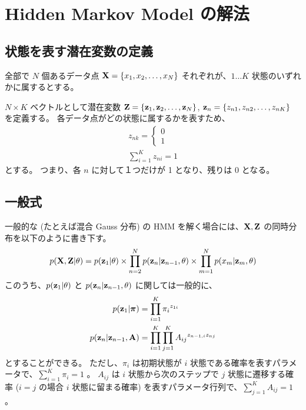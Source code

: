 
\section{ Hidden Markov Model の解法 }

\subsection{ 状態を表す潜在変数の定義 }

全部で $N$ 個あるデータ点 ${\bf X} = \{ x_1, x_2, \dots , x_N\}$ それぞれが、$1 \dots K$ 状態のいずれかに属するとする。

$N \times K$ ベクトルとして潜在変数 ${\bf Z} = \{ {\bf z}_1, {\bf z}_2, \dots, {\bf z}_N \}$, ${\bf z}_n = \{ z_{n1}, z_{n2}, \dots, z_{nK} \}$ を定義する。
各データ点がどの状態に属するかを表すため、
\begin{gather}
  z_{nk} = \begin{cases}
    0  \\
    1  
  \end{cases}  \\
  \sum_{i=1}^K z_{ni} = 1
\end{gather}
とする。
つまり、各 $n$ に対して１つだけが 1 となり、残りは 0 となる。

\subsection{ 一般式 }

一般的な (たとえば混合 Gauss 分布) の HMM を解く場合には、${\bf X}, {\bf Z}$ の同時分布を以下のように書き下す。
\begin{equation}
  p( {\bf X}, {\bf Z} | \theta )  =  p( {\bf z}_1 | \theta ) \times \prod_{n=2}^N p( {\bf z}_n | {\bf z}_{n-1}, \theta ) \times \prod_{m=1}^N p( x_m | {\bf z}_m, \theta )  \label {eqn:hmmLikelihood}
\end{equation}
このうち、$p( {\bf z}_1 | \theta )$ と $p( {\bf z}_n | {\bf z}_{n-1}, \theta )$ に関しては一般的に、
\begin{align}
  p( {\bf z}_1 | {\boldsymbol \pi} )  &=  \prod_{i=1}^K {\pi_i}^{z_{1i}}  \\
  p( {\bf z}_n | {\bf z}_{n-1}, {\bf A} )  &=  \prod_{i=1}^K \prod_{j=1}^K {A_{ij}}^{z_{n-1,i} z_{nj}}
\end{align}
とすることができる。
ただし、$\pi_i$ は初期状態が $i$ 状態である確率を表すパラメータで、$\sum_{i=1}^K \pi_i = 1$ 。
$A_{ij}$ は $i$ 状態から次のステップで $j$ 状態に遷移する確率 ($i=j$ の場合 $i$ 状態に留まる確率) を表すパラメータ行列で、$\sum_{j=1}^K A_{ij} = 1$ 。

